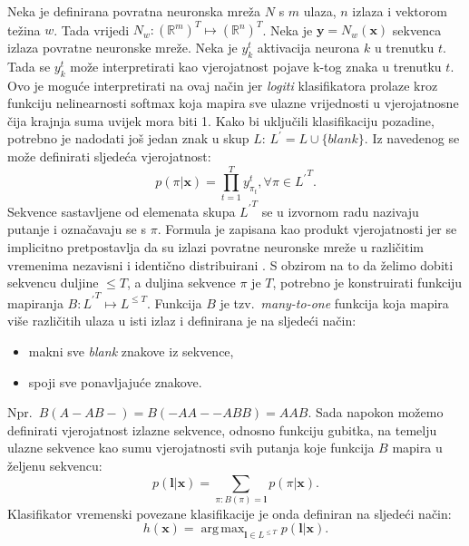 \documentclass[times, utf8, diplomski]{fer}
\DeclareMathOperator*{\argmax}{arg\,max}
\begin{document}
Neka je definirana povratna neuronska mreža $N$ s $m$ ulaza, $n$ izlaza i vektorom težina $w$. Tada vrijedi $N_w : (\mathbb{R}^m)^T \mapsto (\mathbb{R}^n)^T$. Neka je $\pmb{\mathbf{y}} = N_w(\pmb{\mathbf{x}})$ sekvenca izlaza povratne neuronske mreže. Neka je $y_k^t$ aktivacija neurona $k$ u trenutku $t$. Tada se $y_k^t$ može interpretirati kao vjerojatnost pojave k-tog znaka u trenutku $t$. Ovo je moguće interpretirati na ovaj način jer \textit{logiti} klasifikatora prolaze kroz funkciju nelinearnosti softmax koja mapira sve ulazne vrijednosti u vjerojatnosne čija krajnja suma uvijek mora biti 1. Kako bi uključili klasifikaciju pozadine, potrebno je nadodati još jedan znak u skup $L$: $L^{'} = L \cup \{blank\}$. Iz navedenog se može definirati sljedeća vjerojatnost:
\begin{equation}
    p(\pi | \pmb{\mathbf{x}}) = \prod_{t=1}^{T}y_{\pi_t}^t, \forall \pi \in {L^{'}}^T.
    \label{eq:pi_prob}
\end{equation}
Sekvence sastavljene od elemenata skupa ${L^{'}}^T$ se u izvornom radu \citep{ctc-paper} nazivaju putanje  i označavaju se s $\pi$. Formula je zapisana kao produkt vjerojatnosti jer se implicitno pretpostavlja da su izlazi povratne neuronske mreže u različitim vremenima nezavisni i identično distribuirani . S obzirom na to da želimo dobiti sekvencu duljine $\leq T$, a duljina sekvence $\pi$ je $T$, potrebno je konstruirati funkciju mapiranja $B : {L^{'}}^T \mapsto L^{\leq T}$. Funkcija $B$ je tzv.\ \textit{many-to-one} funkcija koja mapira više različitih ulaza u isti izlaz i definirana je na sljedeći način:
\begin{itemize}
    \item makni sve \textit{blank} znakove iz sekvence,
    \item spoji sve ponavljajuće znakove.
\end{itemize}
Npr.\ $B(A-AB-) = B(-AA--ABB) = AAB$. Sada napokon možemo definirati vjerojatnost izlazne sekvence, odnosno funkciju gubitka, na temelju ulazne sekvence kao sumu vjerojatnosti svih putanja koje funkcija $B$ mapira u željenu sekvencu:
\begin{equation}
    p(\pmb{\mathbf{l}} | \pmb{\mathbf{x}}) = \sum_{\pi : B(\pi) = \pmb{\mathbf{l}}}p(\pi|\pmb{\mathbf{x}}).
    \label{eq:l_seq}
\end{equation}
Klasifikator vremenski povezane klasifikacije je onda definiran na sljedeći način:
\begin{equation}
    h(\pmb{\mathbf{x}}) = \argmax_{\pmb{\mathbf{l}} \in L^{\leq T}}p(\pmb{\mathbf{l}} | \pmb{\mathbf{x}}).
\end{equation}
\end{document}
